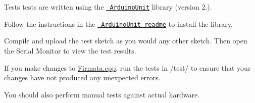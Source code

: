 Tests tests are written using the \href{https://github.com/mmurdoch/arduinounit}{\texttt{ Arduino\+Unit}} library (version 2.).

Follow the instructions in the \href{https://github.com/mmurdoch/arduinounit/blob/master/readme.md}{\texttt{ Arduino\+Unit readme}} to install the library.

Compile and upload the test sketch as you would any other sketch. Then open the Serial Monitor to view the test results.

If you make changes to \mbox{\hyperlink{_firmata_8cpp}{Firmata.\+cpp}}, run the tests in /test/ to ensure that your changes have not produced any unexpected errors.

You should also perform manual tests against actual hardware. 